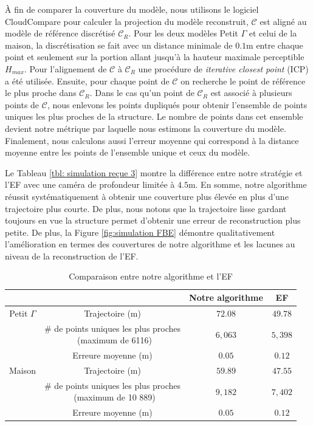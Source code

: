 À fin de comparer la couverture du modèle, nous utilisons le logiciel CloudCompare pour calculer la projection du modèle reconstruit, $\mathcal C$ est aligné au modèle de référence discrétisé $\mathcal C_R$. Pour les deux modèles Petit $\Gamma$ et celui de la maison, la discrétisation se fait avec un distance minimale de $0.1$m entre chaque point et seulement sur la portion allant jusqu'à la hauteur maximale perceptible $H_{max}$. Pour l'alignement de $\mathcal C$  à $\mathcal C_R$ une procédure de \textit{iterative closest point} (ICP) \citep{Rusinkiewicz2001} a été utilisée. Ensuite, pour chaque point de $\mathcal C$ on recherche le point de référence le plus proche dans $\mathcal C_R$. Dans le cas qu'un point de $\mathcal C_R$ est associé à plusieurs points de $\mathcal C$, nous enlevons les points dupliqués pour obtenir l'ensemble de points uniques les plus proches de la structure. Le nombre de points dans cet ensemble devient notre métrique par laquelle nous estimons la couverture du modèle. Finalement, nous calculons aussi l'erreur moyenne qui correspond à la distance moyenne entre les points de l'ensemble unique et ceux du modèle.

Le Tableau \ref{tbl: simulation reçue 3} montre la différence entre notre stratégie et l'EF avec une caméra de profondeur limitée à $4.5$m. En somme, notre algorithme réussit systématiquement à obtenir une couverture plus élevée en plus d'une trajectoire plus courte. De plus, nous notons que la trajectoire lisse gardant toujours en vue la structure permet d'obtenir une erreur de reconstruction plus petite. De plus, la Figure \ref{fig:simulation FBE} démontre qualitativement l'amélioration en termes des couvertures de notre algorithme et les lacunes au niveau de la reconstruction de l'EF.

\begin{table}[!ht]
\renewcommand{\arraystretch}{1.3}
\caption{Comparaison entre notre algorithme et l'EF}
\label{tbl: simulation results 3}
\centering
\begin{tabular}{|c|c|c|c|}
\cline{3-4}
\multicolumn{2}{c|}{} & Notre algorithme & EF \\
\hline
{Petit $\Gamma$} & Trajectoire (m)            & $72.08$  & $49.78$  \\\cline{2-4}
								& \specialcell{\# de points uniques les plus proches \\ (maximum de 6116)} & $6,063$          & $5,398$          \\\cline{2-4}
								& Erreure moyenne (m)             & $0.05$ & $0.12$\\\cline{2-4}
\hline
{Maison} & Trajectoire (m) & $59.89$ & $47.55$ \\\cline{2-4}
					   & \specialcell{\# de points uniques les plus proches \\ (maximum de 10 889)} & $9,182$ & $7,402$ \\\cline{2-4}
					   &  Erreure moyenne (m)             & $0.05$ & $0.12$\\\cline{2-4}
\hline
\end{tabular}
\end{table}


